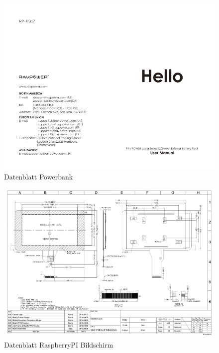 \documentclass[12pt,a4paper]{article}
\begin{document}
\begin{figure}[H]
  \centering
		\includegraphics[scale=1.5, angle=90,page=2]{graphics/powerbank.pdf}
		\caption{Datenblatt Powerbank}
		\label{datasheet:powerbank}
\end{figure}

\begin{figure}[H]
  \centering
		\includegraphics[scale=0.7, angle=90]{graphics/screen.pdf}
		\caption{Datenblatt RaspberryPI Bildschirm}
		\label{datasheet:raspiscreen}
\end{figure}
\end{document}
